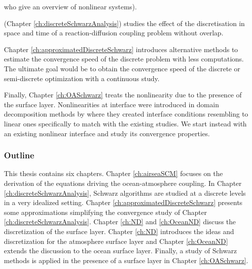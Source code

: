 \citep{haberlein_optimized_2014} who give an overview of
nonlinear systems).
\par
\citep{clement_discrete_2022-1} (Chapter
\ref{ch:discreteSchwarzAnalysis}) studies the effect
of the discretisation in space and time of a reaction-diffusion
coupling problem without overlap.
\par
Chapter \ref{ch:approximatedDiscreteSchwarz}
introduces alternative methods to estimate the convergence
speed of the discrete problem with less computations.
The ultimate goal would be to obtain the convergence speed of
the discrete or semi-discrete optimization with a continuous study.
\par
Finally, Chapter \ref{ch:OASchwarz} treats the nonlinearity due
to the presence of the surface layer. Nonlinearities
at interface were introduced in domain decomposition methods by
\citep{caetano_schwarz_2011} where they created interface
conditions resembling to linear ones specifically to match
with the existing studies.
We start instead with an existing nonlinear interface
and study its convergence properties.
\subsubsection*{Outline}
This thesis contains six chapters.
Chapter \ref{ch:airseaSCM} focuses on the derivation of the equations
driving the ocean-atmosphere coupling.
In Chapter \ref{ch:discreteSchwarzAnalysis}, Schwarz algorithms are studied at a discrete
levels in a very idealized setting.
Chapter \ref{ch:approximatedDiscreteSchwarz} presents some approximations simplifying the
convergence study of Chapter \ref{ch:discreteSchwarzAnalysis}.
Chapter \ref{ch:ND} and \ref{ch:OceanND} discuss the discretization of the
surface layer. Chapter \ref{ch:ND} introduces the ideas and discretization
for the atmosphere surface layer and Chapter \ref{ch:OceanND} extends the
discussion to the ocean surface layer.
Finally, a study of Schwarz methods is applied
in the presence of a surface layer in Chapter \ref{ch:OASchwarz}.
